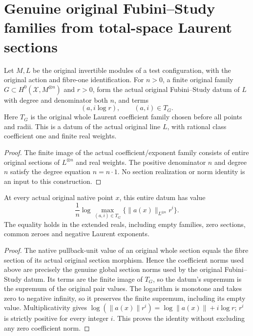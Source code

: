 \section{Genuine original Fubini--Study families from total-space Laurent sections}

\begin{definition}\label{def:native-tc-original-weighted-fs-data}
\leanok
Let $M,L$ be the original invertible modules of a test configuration,
with the original action and fibre-one identification. For $n>0$, a
finite original family $G\subset H^0(\mathcal X,M^{\otimes n})$ and
$r>0$, form the actual original Fubini--Study datum of $L$ with
degree and denominator both $n$, and terms
\[
 (a,i\log r),\qquad (a,i)\in T_G.
\]
Here $T_G$ is the original whole Laurent coefficient family chosen
before all points and radii. This is a datum of the actual original
line $L$, with rational class coefficient one and finite real weights.
\end{definition}
\begin{proof}
The finite image of the actual coefficient/exponent family consists
of entire original sections of $L^{\otimes n}$ and real weights.
The positive denominator $n$ and degree $n$ satisfy the degree
equation $n=n\cdot1$. No section realization or norm identity is an
input to this construction.
\end{proof}

\begin{theorem}\label{thm:native-tc-original-weighted-fs-evaluation}
\leanok
At every actual original native point $x$, this entire datum has value
\[
 \frac1n\log\max_{(a,i)\in T_G}
       \{\lVert a(x)\rVert_{L^{\otimes n}}r^i\}.
\]
The equality holds in the extended reals, including empty families,
zero sections, common zeroes and negative Laurent exponents.
\end{theorem}
\begin{proof}
The native pullback-unit value of an original whole section equals
the fibre section of its actual original section morphism. Hence
the coefficient norms used above are precisely the genuine global
section norms used by the original Fubini--Study datum. Its terms
are the finite image of $T_G$, so the datum's supremum is the
supremum of the original pair values. The logarithm is monotone
and takes zero to negative infinity, so it preserves the finite
supremum, including its empty value. Multiplicativity gives
$\log(\lVert a(x)\rVert r^i)=\log\lVert a(x)\rVert+i\log r$;
$r^i$ is strictly positive for every integer $i$. This proves the
identity without excluding any zero coefficient norm.
\end{proof}

